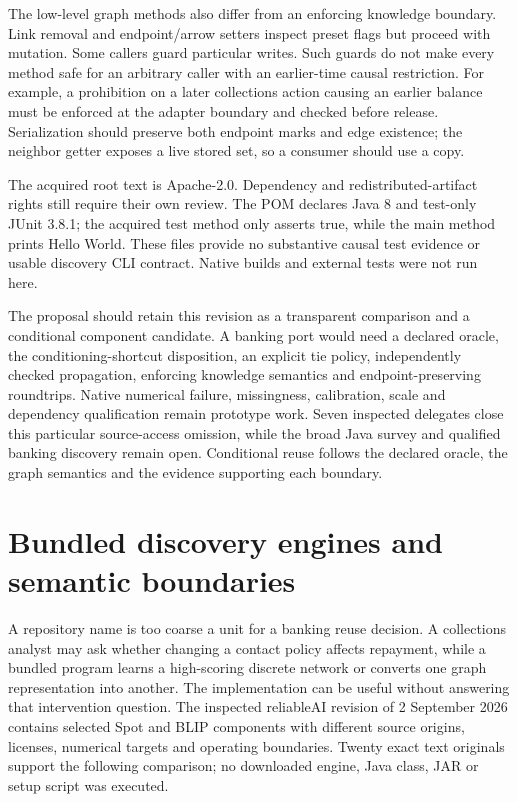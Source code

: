 The low-level graph methods also differ from an enforcing knowledge boundary.
Link removal and endpoint/arrow setters inspect preset flags but proceed with
mutation. Some callers guard particular writes. Such guards do not make every
method safe for an arbitrary caller with an earlier-time causal restriction.
For example, a prohibition on a later collections action causing an earlier
balance must be enforced at the adapter boundary and checked before release.
Serialization should preserve both endpoint marks and edge existence; the
neighbor getter exposes a live stored set, so a consumer should use a copy.
\citep{exec28_fj_java}

The acquired root text is Apache-2.0. Dependency and redistributed-artifact
rights still require their own review. The POM declares Java 8 and test-only
JUnit 3.8.1; the acquired test method only asserts true, while the main method
prints Hello World. These files provide no substantive causal test evidence
or usable discovery CLI contract. Native builds and external tests were not
run here.~\citep{exec28_fj_java}

The proposal should retain this revision as a transparent comparison and a
conditional component candidate. A banking port would need a declared oracle,
the conditioning-shortcut disposition, an explicit tie policy, independently
checked propagation, enforcing knowledge semantics and endpoint-preserving
roundtrips. Native numerical failure, missingness, calibration, scale and
dependency qualification remain prototype work. Seven inspected delegates
close this particular source-access omission, while the broad Java survey and
qualified banking discovery remain open. Conditional reuse follows the
declared oracle, the graph semantics and the evidence supporting each boundary.


\section[Bundled discovery engines and semantic boundaries]{Bundled discovery engines and semantic boundaries}
\label{sec:exec28-nested-engines}
A repository name is too coarse a unit for a banking reuse decision. A collections
analyst may ask whether changing a contact policy affects repayment, while a
bundled program learns a high-scoring discrete network or converts one graph
representation into another. The implementation can be useful without answering
that intervention question. The inspected reliableAI revision of 2 September
2026 contains selected Spot and BLIP components with different source origins,
licenses, numerical targets and operating boundaries. Twenty exact text originals
support the following comparison; no downloaded engine, Java class, JAR or setup
script was executed.~\citep{exec28_nested_sources}

